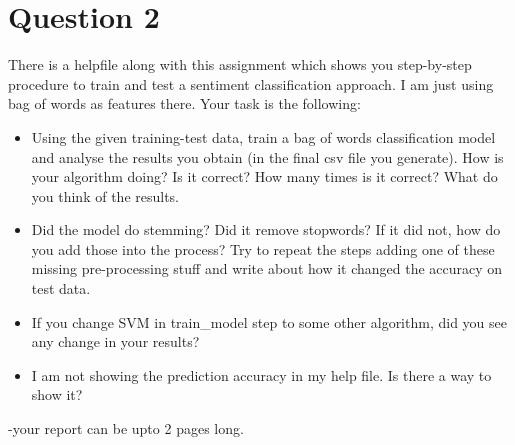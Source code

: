 \documentclass[11pt,a4paper]{article}
\begin{document}
\section*{Question 2}
There is a helpfile along with this assignment which shows you step-by-step procedure to train and test a sentiment classification approach. I am just using bag of words as features there. Your task is the following:
\begin{itemize}
\item Using the given training-test data, train a bag of words classification model and analyse the results you obtain (in the final csv file you generate). How is your algorithm doing? Is it correct? How many times is it correct? What do you think of the results.
\item Did the model do stemming? Did it remove stopwords? If it did not, how do you add those into the process? Try to repeat the steps adding one of these missing pre-processing stuff and write about how it changed the accuracy on test data.
\item If you change SVM in train\_model step to some other algorithm, did you see any change in your results?
\item I am not showing the prediction accuracy in my help file. Is there a way to show it?  
\end{itemize}
-your report can be upto 2 pages long. 
\end{document}
